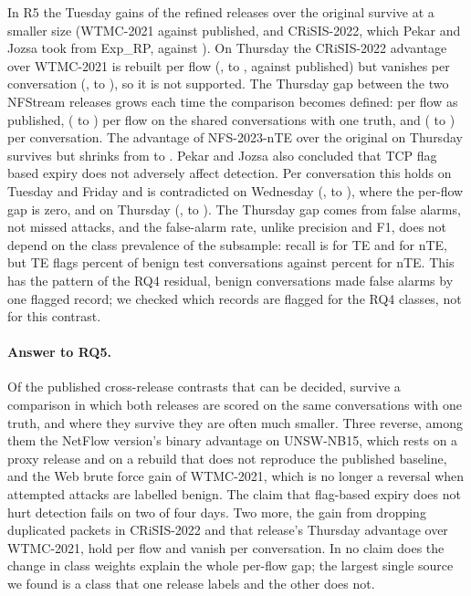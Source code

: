 In R5 the Tuesday gains of the refined releases over the original survive at a smaller size (WTMC-2021 \RQfiveTueWtmcConv{} against \RQfiveTueWtmcPub{} published, and CRiSIS-2022, which Pekar and Jozsa took from Exp\_RP, \RQfiveTueCrisisConv{} against \RQfiveTueCrisisPub{}). On Thursday the CRiSIS-2022 advantage over WTMC-2021 is rebuilt per flow (\RQfiveThuCrisisFlow{}, \RQfiveThuCrisisFlowLo{} to \RQfiveThuCrisisFlowHi{}, against \RQfiveThuCrisisPub{} published) but vanishes per conversation (\RQfiveThuCrisisConv{}, \RQfiveThuCrisisConvLo{} to \RQfiveThuCrisisConvHi{}), so it is not supported. The Thursday gap between the two NFStream releases grows each time the comparison becomes defined: \RQfiveThuNteTeFlow{} per flow as published, \RQfiveThuNteTeFlowDef{} (\RQfiveThuNteTeFlowDefLo{} to \RQfiveThuNteTeFlowDefHi{}) per flow on the shared conversations with one truth, and \RQfiveThuNteTeConv{} (\RQfiveThuNteTeConvLo{} to \RQfiveThuNteTeConvHi{}) per conversation. The advantage of NFS-2023-nTE over the original on Thursday survives but shrinks from \RQfiveThuNteCicPub{} to \RQfiveThuNteCicConv{}. Pekar and Jozsa also concluded that TCP flag based expiry does not adversely affect detection. Per conversation this holds on Tuesday and Friday and is contradicted on Wednesday (\RQfiveWedTeConv{}, \RQfiveWedTeConvLo{} to \RQfiveWedTeConvHi{}), where the per-flow gap is zero, and on Thursday (\RQfiveThuTeConv{}, \RQfiveThuTeConvLo{} to \RQfiveThuTeConvHi{}). The Thursday gap comes from false alarms, not missed attacks, and the false-alarm rate, unlike precision and F1, does not depend on the class prevalence of the subsample: recall is \RQfiveThuRecallTe{} for TE and \RQfiveThuRecallNte{} for nTE, but TE flags \RQfiveThuFprTe{} percent of benign test conversations against \RQfiveThuFprNte{} percent for nTE. This has the pattern of the RQ4 residual, benign conversations made false alarms by one flagged record; we checked which records are flagged for the RQ4 classes, not for this contrast.

\paragraph{Answer to RQ5.} Of the \RevFiveDecided{} published cross-release contrasts that can be decided, \RQfiveSurvive{} survive a comparison in which both releases are scored on the same conversations with one truth, and where they survive they are often much smaller. Three reverse, among them the NetFlow version's binary advantage on UNSW-NB15, which rests on a proxy release and on a rebuild that does not reproduce the published baseline, and the Web brute force gain of WTMC-2021, which is no longer a reversal when attempted attacks are labelled benign. The claim that flag-based expiry does not hurt detection fails on two of four days. Two more, the gain from dropping duplicated packets in CRiSIS-2022 and that release's Thursday advantage over WTMC-2021, hold per flow and vanish per conversation. In no claim does the change in class weights explain the whole per-flow gap; the largest single source we found is a class that one release labels and the other does not.
